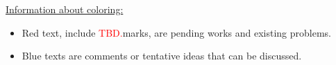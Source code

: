\documentclass[twoside,12pt, a4paper]{article}
\numberwithin{equation}{section}
\theoremstyle{remark}
\newcommand\TBD{\textcolor{red}{TBD.}}
\begin{document}
	\underline{\textsf{Information about coloring:}}
	\begin{itemize}
		\item 
	\textsf{\color{red} Red text, include \TBD marks, are pending works and existing problems.}
		\item 
			\textsf{\color{blue} Blue texts are comments or tentative ideas that can be discussed.}
	\end{itemize}



\printbibliography
\end{document}
